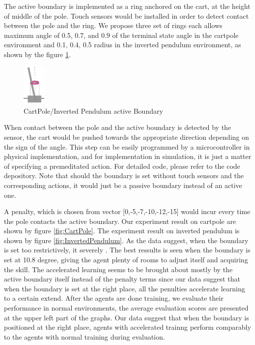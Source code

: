 \documentclass[journal]{IEEEtran}
\begin{document}
The active boundary is implemented as a ring anchored on the cart, at the height of middle of the pole. Touch sensors would be installed in order to detect contact between the pole and the ring. We propose three set of rings each allows maximum angle of 0.5, 0.7, and 0.9 of the terminal state angle in the cartpole environment and 0.1, 0.4, 0.5 radius in the inverted pendulum environment, as shown by the figure \ref{fig:cartpolePB}. 

\begin{figure}
     \centering
      \includegraphics[width=0.1\textwidth]{cartpole1.png}
      \caption{CartPole/Inverted Pendulum active Boundary}
      \label{fig:cartpolePB}
\end{figure}
When contact between the pole and the active boundary is detected by the sensor, the cart would be pushed towards the appropriate direction depending on the sign of the angle. This step can be easily programmed by a microcontroller in physical implementation, and for implementation in simulation, it is just a matter of specifying a premeditated action. For detailed code, please refer to the code depository. Note that should the boundary is set without touch sensors and the corresponding actions, it would just be a passive boundary instead of an active one. 

A penalty, which is chosen from vector [0,-5,-7,-10,-12,-15] would incur every time the pole contacts the active boundary. Our experiment result on cartpole are shown by figure \ref{fig:CartPole}. The experiment result on inverted pendulum is shown by figure \ref{fig:InvertedPendulum}. As the data suggest, when the boundary is set too restrictively, it severely . The best ressults is seen when the boundary is set at 10.8 degree, giving the agent plenty of rooms to adjust itself and acquiring the skill. The accelerated learning seems to be brought about mostly by the active boundary itself instead of the penalty terms since our data suggest that when the boundary is set at the right place, all the penulties accelerate learning to a certain extend. After the agents are done training, we evaluate their performance in normal environments, the average evaluation scores are presented at the upper left part of the graphs. Our data suggest that when the boundary is positioned at the right place, agents with accelerated trainng perform comparably to the agents with normal training during evaluation.
\end{document}
